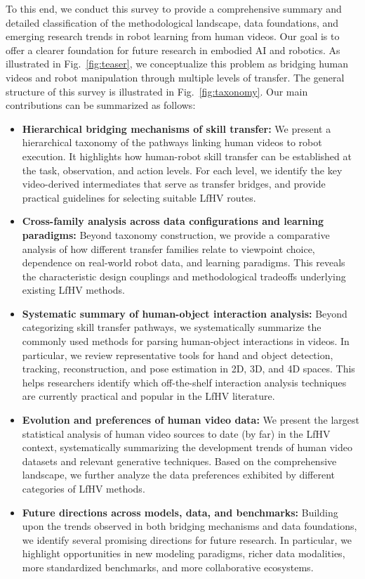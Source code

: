 \documentclass[Afour,sageh,times]{sagej}
\begin{document}
To this end, we conduct this survey to provide a comprehensive summary and detailed classification of the methodological landscape, data foundations, and emerging research trends in robot learning from human videos. Our goal is to offer a clearer foundation for future research in embodied AI and robotics. As illustrated in Fig.~\ref{fig:teaser}, we conceptualize this problem as bridging human videos and robot manipulation through multiple levels of transfer. The general structure of this survey is illustrated in Fig.~\ref{fig:taxonomy}. Our main contributions can be summarized as follows:
\begin{itemize}[leftmargin=1em]
    \setlength{\parskip}{0pt}
    \item \textbf{Hierarchical bridging mechanisms of skill transfer:} We present a hierarchical taxonomy of the pathways linking human videos to robot execution. It highlights how human-robot skill transfer can be established at the task, observation, and action levels. For each level, we identify the key video-derived intermediates that serve as transfer bridges, and provide practical guidelines for selecting suitable LfHV routes.
    \item \textbf{Cross-family analysis across data configurations and learning paradigms:} Beyond taxonomy construction, we provide a comparative analysis of how different transfer families relate to viewpoint choice, dependence on real-world robot data, and learning paradigms. This reveals the characteristic design couplings and methodological tradeoffs underlying existing LfHV methods.
    \item \textbf{Systematic summary of human-object interaction analysis:} Beyond categorizing skill transfer pathways, we systematically summarize the commonly used methods for parsing human-object interactions in videos. In particular, we review representative tools for hand and object detection, tracking, reconstruction, and pose estimation in 2D, 3D, and 4D spaces. This helps researchers identify which off-the-shelf interaction analysis techniques are currently practical and popular in the LfHV literature.
    \item \textbf{Evolution and preferences of human video data:} We present the largest statistical analysis of human video sources to date (by far) in the LfHV context, systematically summarizing the development trends of human video datasets and relevant generative techniques. Based on the comprehensive landscape, we further analyze the data preferences exhibited by different categories of LfHV methods.
    \item \textbf{Future directions across models, data, and benchmarks:} Building upon the trends observed in both bridging mechanisms and data foundations, we identify several promising directions for future research. In particular, we highlight opportunities in new modeling paradigms, richer data modalities, more standardized benchmarks, and more collaborative ecosystems.
\end{itemize}
\end{document}
